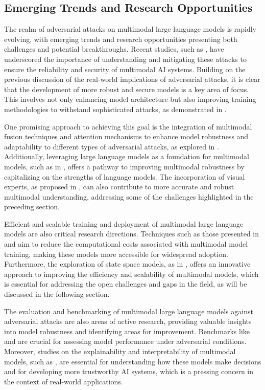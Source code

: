 \documentclass[11pt,a4paper]{article}
\begin{document}
\subsection{Emerging Trends and Research Opportunities}


The realm of adversarial attacks on multimodal large language models is rapidly evolving, with emerging trends and research opportunities presenting both challenges and potential breakthroughs. Recent studies, such as \cite{doi:10.1109/bigdata59044.2023.10386743}, have underscored the importance of understanding and mitigating these attacks to ensure the reliability and security of multimodal AI systems. Building on the previous discussion of the real-world implications of adversarial attacks, it is clear that the development of more robust and secure models is a key area of focus. This involves not only enhancing model architecture but also improving training methodologies to withstand sophisticated attacks, as demonstrated in \cite{doi:10.1109/tnnls.2025.3592935}.

One promising approach to achieving this goal is the integration of multimodal fusion techniques and attention mechanisms to enhance model robustness and adaptability to different types of adversarial attacks, as explored in \cite{arxiv:2402.12750}. Additionally, leveraging large language models as a foundation for multimodal models, such as in \cite{arxiv:2305.16103}, offers a pathway to improving multimodal robustness by capitalizing on the strengths of language models. The incorporation of visual experts, as proposed in \cite{arxiv:2401.03105}, can also contribute to more accurate and robust multimodal understanding, addressing some of the challenges highlighted in the preceding section.

Efficient and scalable training and deployment of multimodal large language models are also critical research directions. Techniques such as those presented in \cite{arxiv:2402.11530} and \cite{arxiv:2408.11795} aim to reduce the computational costs associated with multimodal model training, making these models more accessible for widespread adoption. Furthermore, the exploration of state space models, as in \cite{arxiv:2403.13600}, offers an innovative approach to improving the efficiency and scalability of multimodal models, which is essential for addressing the open challenges and gaps in the field, as will be discussed in the following section.

The evaluation and benchmarking of multimodal large language models against adversarial attacks are also areas of active research, providing valuable insights into model robustness and identifying areas for improvement. Benchmarks like \cite{arxiv:2407.15272} and \cite{arxiv:2402.14154} are crucial for assessing model performance under adversarial conditions. Moreover, studies on the explainability and interpretability of multimodal models, such as \cite{arxiv:2412.02104}, are essential for understanding how these models make decisions and for developing more trustworthy AI systems, which is a pressing concern in the context of real-world applications.
\end{document}
